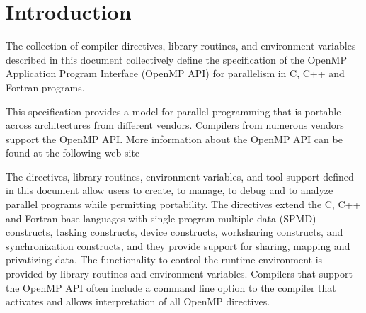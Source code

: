 \chapter{Introduction}
\label{chap:introduction}
The collection of compiler directives, library routines, and environment
variables described in this document collectively define the specification of
the OpenMP Application Program Interface (OpenMP API) for parallelism in C, C++
and Fortran programs.

This specification provides a model for parallel programming that is portable
across architectures from different vendors. Compilers from numerous vendors
support the OpenMP API. More information about the OpenMP API can be found at
the following web site


The directives, library routines, environment variables, and tool support 
defined in this document allow users to create, to manage, to debug and to 
analyze parallel programs while permitting portability. The directives extend 
the C, C++ and Fortran base languages with single program multiple
data (SPMD) constructs, tasking constructs, device constructs, worksharing 
constructs, and synchronization constructs, and they provide support for 
sharing, mapping and privatizing data. The functionality to control the 
runtime environment is provided by library routines and environment 
variables. Compilers that support the OpenMP API often include a command 
line option to the compiler that activates and allows interpretation of
all OpenMP directives.













